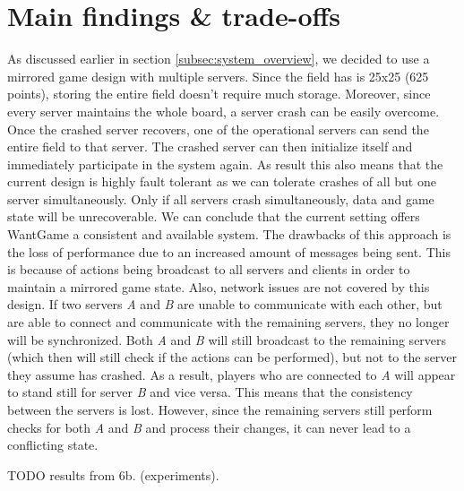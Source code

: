\section{Main findings \& trade-offs}
\label{sec:discussion}

	As discussed earlier in section \ref{subsec:system_overview}, we decided to use a mirrored game design with multiple servers. 
	Since the field has is 25x25 (625 points), storing the entire field doesn't require much storage. 
	Moreover, since every server maintains the whole board, a server crash can be easily overcome.
	Once the crashed server recovers, one of the operational servers can send the entire field to that server. 
	The crashed server can then initialize itself and immediately participate in the system again. 
	As result this also means that the current design is highly fault tolerant as we can tolerate crashes of all but one server simultaneously. 
	Only if all servers crash simultaneously, data and game state will be unrecoverable.
	We can conclude that the current setting offers WantGame a consistent and available system. 
	The drawbacks of this approach is the loss of performance due to an increased amount of messages being sent. 
	This is because of actions being broadcast to all servers and clients in order to maintain a mirrored game state. 
	Also, network issues are not covered by this design. 
	If two servers \emph{A} and \emph{B} are unable to communicate with each other, but are able to connect and communicate with the remaining servers, they no longer will be synchronized. 
	Both \emph{A} and \emph{B} will still broadcast to the remaining servers (which then will still check if the actions can be performed), but not to the server they assume has crashed. 
	As a result, players who are connected to \emph{A} will appear to stand still for server \emph{B} and vice versa. This means that the consistency between the servers is lost. However, since the remaining servers still perform checks for both \emph{A} and \emph{B} and process their changes, it can never lead to a conflicting state.
	
	TODO results from 6b. (experiments).